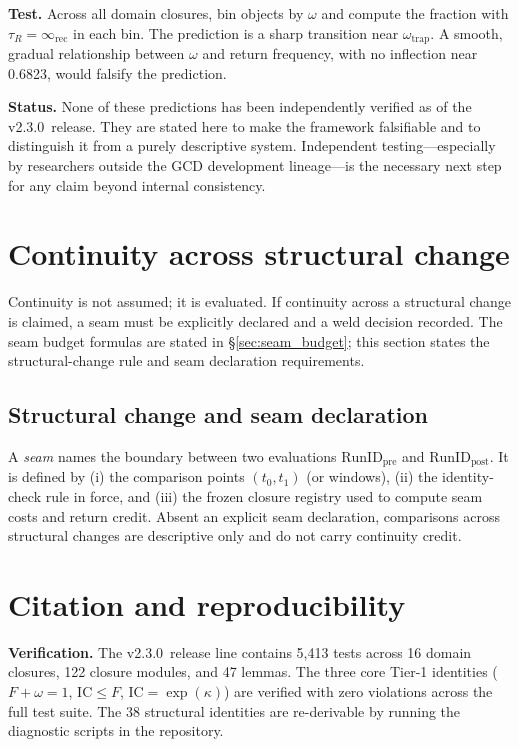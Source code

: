 \documentclass[
  aps,
  prd,
  preprint,
  superscriptaddress,
  nofootinbib,
  floatfix
]{revtex4-2}
\newcommand{\Rinf}{\infty_{\mathrm{rec}}}
\newcommand{\IC}{\mathrm{IC}}
\newcommand{\ValidatorLine}{v2.3.0}
\begin{document}
\textbf{Test.} Across all domain closures, bin objects by $\omega$ and compute the fraction with $\tau_R = \Rinf$
in each bin. The prediction is a sharp transition near $\omega_{\mathrm{trap}}$.
A smooth, gradual relationship between $\omega$ and return frequency, with no inflection near 0.6823,
would falsify the prediction.

\medskip
\noindent\textbf{Status.}
None of these predictions has been independently verified as of the \ValidatorLine\ release.
They are stated here to make the framework falsifiable and to distinguish it from a purely descriptive system.
Independent testing---especially by researchers outside the GCD development lineage---is the necessary
next step for any claim beyond internal consistency.

\section{Continuity across structural change}
\label{sec:continuity}

Continuity is not assumed; it is evaluated. If continuity across a structural change is claimed, a seam must be
explicitly declared and a weld decision recorded. The seam budget formulas are stated in \S\ref{sec:seam_budget};
this section states the structural-change rule and seam declaration requirements.

\subsection{Structural change and seam declaration}
A \emph{seam} names the boundary between two evaluations $\mathrm{RunID}_{\mathrm{pre}}$ and $\mathrm{RunID}_{\mathrm{post}}$.
It is defined by (i) the comparison points $(t_0,t_1)$ (or windows), (ii) the identity-check rule in force,
and (iii) the frozen closure registry used to compute seam costs and return credit.
Absent an explicit seam declaration, comparisons across structural changes are descriptive only and do not carry continuity credit.
\section{Citation and reproducibility}
\label{sec:citation_repro}

\noindent\textbf{Verification.}
The \ValidatorLine\ release line contains 5{,}413 tests across 16 domain closures, 122 closure modules,
and 47 lemmas. The three core Tier-1 identities ($F+\omega=1$, $\IC\le F$, $\IC=\exp(\kappa)$) are verified with
zero violations across the full test suite. The 38 structural identities are re-derivable by running the diagnostic
scripts in the repository.
\end{document}
